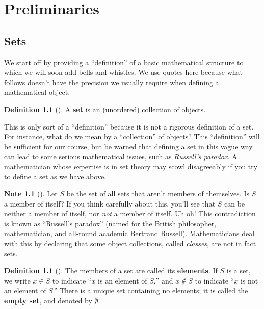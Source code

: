 \documentclass[10pt,]{book}
\newcommand{\terminology}[1]{\textbf{#1}}
\theoremstyle{plain}
\theoremstyle{definition}
\newtheorem{definition}[theorem]{Definition}
\theoremstyle{definition}
\newtheorem{note}[theorem]{Note}
\theoremstyle{definition}
\theoremstyle{definition}
\numberwithin{equation}{section}
\begin{document}
\chapter[{Preliminaries}]{Preliminaries}\label{pre}
\typeout{************************************************}
\typeout{************************************************}
\section[{Sets}]{Sets}\label{sets}
We start off by providing a ``definition'' of a basic mathematical structure to which we will soon add bells and whistles. We use quotes here because what follows doesn't have the precision we usually require when defining a mathematical object.%
\begin{definition}[{}]\label{definition-1}
A \terminology{set} is an (unordered) collection of objects.%
\end{definition}
This is only sort of  a ``definition'' because it is not a rigorous definition of a set. For instance, what do we mean by a ``collection'' of objects? This ``definition'' will be sufficient for our course, but be warned that defining a set in this vague way can lead to some serious mathematical issues, such as \emph{Russell's paradox}.  A mathematician whose expertise is in set theory may scowl disagreeably if you try to define a set as we have above.%
\begin{note}[]\label{note-1}
Let \(S\) be the set of all sets that aren't members of themselves.  Is \(S\) a member of itself? If you think carefully about this, you'll see that \(S\) can be neither a member of itself, nor \emph{not} a member of itself. Uh oh!  This contradiction is known as ``Russell's paradox'' (named for the British philosopher, mathematician, and all-round academic Bertrand Russell). Mathematicians deal with this by declaring that some object collections, called \emph{classes}, are not in fact sets.%
\end{note}
\begin{definition}[{}]\label{definition-2}
\label{notation-1}
\label{notation-2}
\label{notation-3}
The members of a set are called its \terminology{elements}. If \(S\) is a set, we write \(x\in S\) to indicate ``\(x\) is an element of \(S\),'' and \(x \not\in S\) to indicate ``\(x\) is not an element of \(S\).'' There is a unique set containing no elements; it is called the \terminology{empty set}, and denoted by \(\emptyset\).%
\end{definition}
\end{document}
